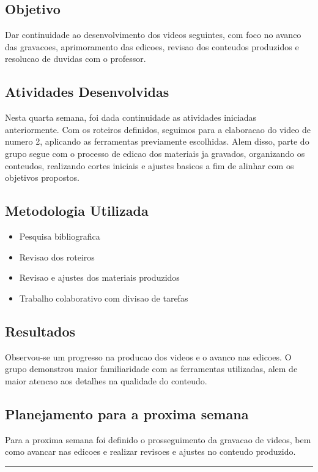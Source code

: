 \subsection{Objetivo}
Dar continuidade ao desenvolvimento dos videos seguintes, com foco no avanco das gravacoes, aprimoramento das edicoes, revisao dos conteudos produzidos e resolucao de duvidas com o professor.

\subsection{Atividades Desenvolvidas}
Nesta quarta semana, foi dada continuidade as atividades iniciadas anteriormente. Com os roteiros definidos, seguimos para a elaboracao do video de numero 2, aplicando as ferramentas previamente escolhidas. Alem disso, parte do grupo segue com o processo de edicao dos materiais ja gravados, organizando os conteudos, realizando cortes iniciais e ajustes basicos a fim de alinhar com os objetivos propostos.

\subsection{Metodologia Utilizada}
\begin{itemize}
    \item Pesquisa bibliografica
    \item Revisao dos roteiros
    \item Revisao e ajustes dos materiais produzidos
    \item Trabalho colaborativo com divisao de tarefas
\end{itemize}

\subsection{Resultados}
Observou-se um progresso na producao dos videos e o avanco nas edicoes. O grupo demonstrou maior familiaridade com as ferramentas utilizadas, alem de maior atencao aos detalhes na qualidade do conteudo.

\subsection{Planejamento para a proxima semana}
Para a proxima semana foi definido o prosseguimento da gravacao de videos, bem como avancar nas edicoes e realizar revisoes e ajustes no conteudo produzido.

\bigskip
\hrule
\bigskip

